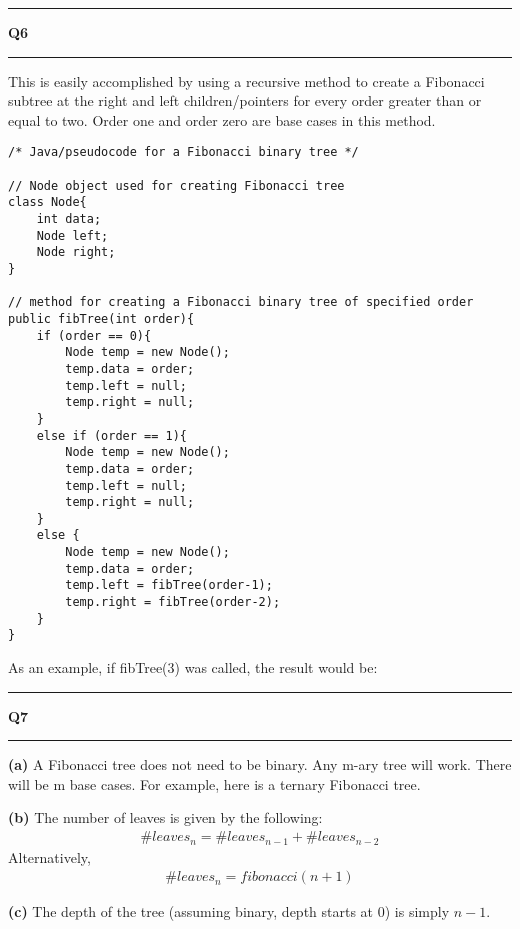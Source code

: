 \documentclass[11pt]{article}
\newcommand\question[2]{\vspace{.25in}\hrule\textbf{#1 #2}\vspace{.5em}\hrule\vspace{.10in}}
\renewcommand\part[1]{\vspace{.10in}\textbf{(#1)}}
\begin{document}
\question{Q6}{}
This is easily accomplished by using a recursive method to create a Fibonacci subtree at the right and left children/pointers for every order greater than or equal to two. Order one and order zero are base cases in this method.
\begin{lstlisting}
/* Java/pseudocode for a Fibonacci binary tree */

// Node object used for creating Fibonacci tree
class Node{
	int data;
	Node left;
	Node right;
}

// method for creating a Fibonacci binary tree of specified order
public fibTree(int order){
	if (order == 0){
		Node temp = new Node();
		temp.data = order;
		temp.left = null;
		temp.right = null;		
	}
	else if (order == 1){
		Node temp = new Node();
		temp.data = order;
		temp.left = null;
		temp.right = null;
	} 
	else {
		Node temp = new Node();
		temp.data = order;
		temp.left = fibTree(order-1);
		temp.right = fibTree(order-2);
	}
}
\end{lstlisting}

As an example, if fibTree(3) was called, the result would be:

\begin{center}
\end{center}

\question{Q7}{}
\part{a} 
A Fibonacci tree does not need to be binary. Any m-ary tree will work. There will be m base cases. For example, here is a ternary Fibonacci tree.

\begin{center}
\end{center}

\part{b}
The number of leaves is given by the following:
\begin{align*}
\# leaves_n = \# leaves_{n-1} + \# leaves_{n-2}
\end{align*}
Alternatively,
\begin{align*}
\# leaves_n = fibonacci(n+1)
\end{align*}

\part{c}
The depth of the tree (assuming binary, depth starts at 0) is simply $n-1$.
\end{document}
